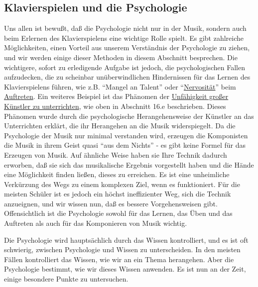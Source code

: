 
\subsection{Klavierspielen und die Psychologie}
\label{c1iii21}

Uns allen ist bewußt, daß die Psychologie nicht nur in der Musik, sondern auch beim Erlernen des Klavierspielens eine wichtige Rolle spielt.
Es gibt zahlreiche Möglichkeiten, einen Vorteil aus unserem Verständnis der Psychologie zu ziehen, und wir werden einige dieser Methoden in diesem Abschnitt besprechen.
Die wichtigere, sofort zu erledigende Aufgabe ist jedoch, die psychologischen Fallen aufzudecken, die zu scheinbar unüberwindlichen Hindernissen für das Lernen des Klavierspielens führen, wie z.B. \enquote{Mangel an Talent} oder \enquote{\hyperref[c1iii15]{Nervosität}} beim \hyperref[c1iii14]{Auftreten}.
Ein weiteres Beispiel ist das Phänomen der \hyperref[c1iii16e]{Unfähigkeit großer Künstler zu unterrichten}, wie oben in Abschnitt 16.e beschrieben.
Dieses Phänomen wurde durch die psychologische Herangehensweise der Künstler an das Unterrichten erklärt, die ihr Herangehen an die Musik widerspiegelt.
Da die Psychologie der Musik nur minimal verstanden wird, erzeugen die Komponisten die Musik in ihrem Geist quasi \enquote{aus dem Nichts} - es gibt keine Formel für das Erzeugen von Musik.
Auf ähnliche Weise haben sie Ihre Technik dadurch erworben, daß sie sich das musikalische Ergebnis vorgestellt haben und  die Hände eine Möglichkeit finden ließen, dieses zu erreichen.
Es ist eine unheimliche Verkürzung des Wegs zu einem komplexen Ziel, wenn es funktioniert.
Für die meisten Schüler ist es jedoch ein höchst ineffizienter Weg, sich die Technik anzueignen, und wir wissen nun, daß es bessere Vorgehensweisen gibt.
Offensichtlich ist die Psychologie sowohl für das Lernen, das Üben und das Auftreten als auch für das Komponieren von Musik wichtig.

Die Psychologie wird hauptsächlich durch das Wissen kontrolliert, und es ist oft schwierig, zwischen Psychologie und Wissen zu unterscheiden.
In den meisten Fällen kontrolliert das Wissen, wie wir an ein Thema herangehen.
Aber die Psychologie bestimmt, wie wir dieses Wissen anwenden.
Es ist nun an der Zeit, einige besondere Punkte zu untersuchen.


